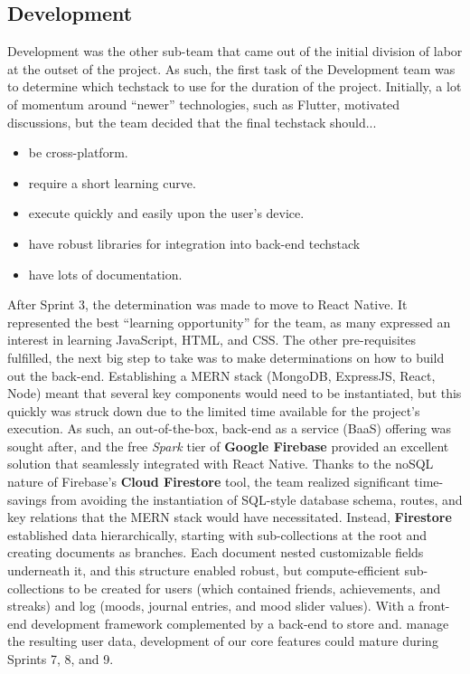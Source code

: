 \documentclass[10pt,american english]{article}
\begin{document}
\subsection*{Development}
Development was the other sub-team that came out of the initial division of labor at the outset of the project. As such, the first task of the Development team was to determine which techstack to use for the duration of the project. Initially, a lot of momentum around ``newer'' technologies, such as Flutter, motivated discussions, but the team decided that the final techstack should...
 \begin{itemize}
\item be cross-platform.
\item require a short learning curve.
\item execute quickly and easily upon the user's device.
\item have robust libraries for integration into back-end techstack
\item have lots of documentation.
\end{itemize}
After Sprint 3, the determination was made to move to React Native. It represented the best ``learning opportunity'' for the team, as many expressed an interest in learning JavaScript, HTML, and CSS. The other pre-requisites fulfilled, the next big step to take was to make determinations on how to build out the back-end. 
\newline
\newline
Establishing a MERN stack (MongoDB, ExpressJS, React, Node) meant that several key components would need to be instantiated, but this quickly was struck down due to the limited time available for the project's execution. As such, an out-of-the-box, back-end as a service (BaaS) offering was sought after, and the free \textit{Spark} tier of \textbf{Google Firebase} provided an excellent solution that seamlessly integrated with React Native.
\newline
\newline
Thanks to the noSQL nature of Firebase's \textbf{Cloud Firestore} tool, the team realized significant time-savings from avoiding the instantiation of SQL-style database schema, routes, and key relations that the MERN stack would have necessitated. Instead, \textbf{Firestore} established data hierarchically, starting with sub-collections at the root and creating documents as branches. Each document nested customizable fields underneath it, and this structure enabled robust, but compute-efficient sub-collections to be created for users (which contained friends, achievements, and streaks) and log (moods, journal entries, and mood slider values). With a front-end development framework complemented by a back-end to store and. manage the resulting user data, development of our core features could mature during Sprints 7, 8, and 9.
\end{document}
